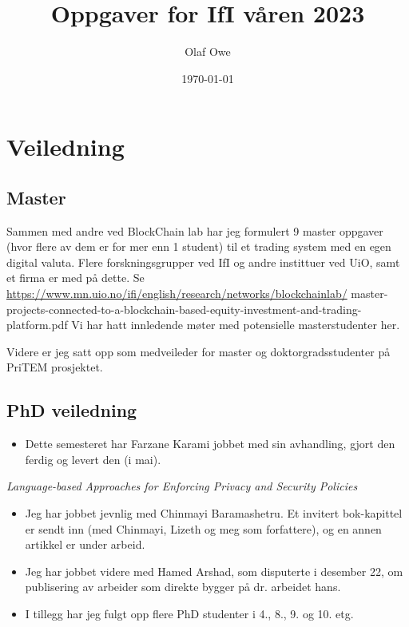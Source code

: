 \documentclass[11pt]{article}
\author{Olaf Owe}
\date{\today}
\title{Oppgaver for IfI våren 2023}
\begin{document}
\maketitle



\section{Veiledning}
\label{sec-1}

\subsection{Master}
\label{sec-1-1}

Sammen med andre ved BlockChain lab har jeg formulert 9 master oppgaver
(hvor flere av dem er for mer enn 1 student)
 til et trading system med en egen digital valuta.
Flere forskningsgrupper ved IfI og andre instittuer ved UiO,  samt et firma er med på dette.
Se 
\url{https://www.mn.uio.no/ifi/english/research/networks/blockchainlab/}
master-projects-connected-to-a-blockchain-based-equity-investment-and-trading-platform.pdf
Vi har hatt innledende møter med potensielle masterstudenter her.


Videre er jeg  satt opp som medveileder for master og doktorgradsstudenter
på PriTEM prosjektet.

\subsection{PhD veiledning}
\label{sec-1-2}
\begin{itemize}
\item Dette semesteret har Farzane Karami jobbet med sin
avhandling, gjort den ferdig og levert den (i mai).
\end{itemize}
\emph{Language-based Approaches for Enforcing Privacy and Security Policies}

\begin{itemize}
\item Jeg har jobbet jevnlig med Chinmayi Baramashetru. Et invitert bok-kapittel
er sendt inn (med Chinmayi, Lizeth og meg som forfattere),
og en annen artikkel er under arbeid.

\item Jeg har jobbet videre med Hamed Arshad, som  disputerte i desember 22,
om publisering av arbeider som direkte bygger på dr. arbeidet hans.

\item I tillegg har jeg fulgt opp flere PhD studenter i 4., 8., 9. og 10. etg.
\end{itemize}
\end{document}
